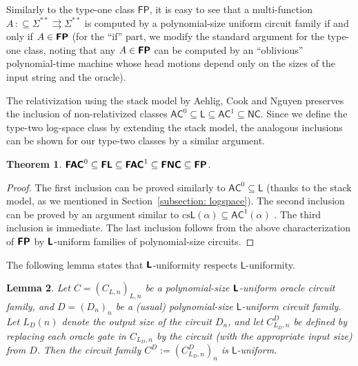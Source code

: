 \documentclass[conference]{IEEEtran}
\newcommand{\classonefont}[1]{\mathsf{#1}}
\newcommand{\classL}{\classonefont{L}}
\newcommand{\classFP}{\classonefont{FP}}
\newcommand{\classNC}{\classonefont{NC}}
\newcommand{\classAC}{\classonefont{AC}}
\newcommand{\classtwofont}[1]{\text{\bfseries \sffamily \upshape #1}}
\newcommand{\classLtwo}{\classtwofont{L}}
\newcommand{\classFLtwo}{\classtwofont{FL}}
\newcommand{\classFNCtwo}{\classtwofont{FNC}}
\newcommand{\classFACtwo}{\classtwofont{FAC}}
\newcommand{\classFPtwo}{\classtwofont{FP}}
\newcommand{\LM}{\varSigma ^{**}}
\newtheorem{theorem}{Theorem}[section]
\newtheorem{lemma}[theorem]{Lemma}
\theoremstyle{definition}
\theoremstyle{remark}
\newcommand{\pcolon}{\mathpunct{\,:\subseteq}}
\begin{document}
Similarly to the type-one class $\classFP$, it is easy to see that
a multi-function $A \pcolon \LM \rightrightarrows \LM$ is computed by a polynomial-size
uniform circuit family if and only if $A \in \classFPtwo$
(for the ``if'' part, we modify the standard argument for the type-one class, 
noting that any $A \in \classFPtwo$ can be computed by 
an ``oblivious'' polynomial-time machine 
whose head motions depend only on the sizes of 
the input string and the oracle).

The relativization using the stack model by Aehlig, Cook and Nguyen preserves
the inclusion of non-relativized classes
$\classAC^0 \subseteq \classL \subseteq \classAC^1 \subseteq \classNC$.
Since we define the type-two log-space class by extending the stack model,
the analogous inclusions can be shown for our type-two classes
by a similar argument. 

\begin{theorem}
\label{theorem:inclusion}
$ \classFACtwo^0
 \subseteq \classFLtwo 
 \subseteq \classFACtwo^1
 \subseteq \classFNCtwo
 \subseteq \classFPtwo$. 
\end{theorem}

\begin{proof}
 The first inclusion can be proved similarly
 to $\classAC^0 \subseteq \classL$ (thanks to the stack model, as we mentioned 
 in Section~\ref{subsection: logspace}).
 The second inclusion can be proved by an argument similar to
 $\text{cs}\classL(\alpha) \subseteq \classAC^1(\alpha)$
 \cite{aehlig2007relativizing}.
 The third inclusion is immediate.
 The last inclusion follows from the above characterization of $\classFPtwo$
 by $\classLtwo$-uniform families of polynomial-size circuits.
\end{proof}

The following lemma states that $\classLtwo$-uniformity respects
$\classL$-uniformity.

\begin{lemma}
\label{lemma: respects uniformity}
 Let $C = (C _{L, n}) _{L, n}$ be a 
 polynomial-size $\classLtwo$-uniform oracle circuit family, 
 and $D = (D _n) _n$ be a (usual) polynomial-size $\classL$-uniform circuit family.
 Let $L _D (n)$ denote the output size of the circuit $D _n$, 
 and let $C _{L _D, n} ^D$ be 
 defined by replacing each oracle gate in $C _{L _D, n}$
 by the circuit (with the appropriate input size) from $D$. 
 Then the circuit family $C ^D := (C _{L _D, n} ^D) _n$ is $\classL$-uniform.
\end{lemma}
\end{document}
